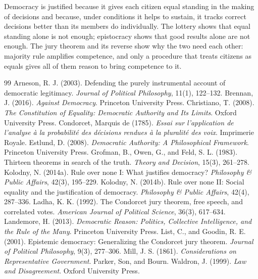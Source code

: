 \documentclass{situationist-preprint}
\begin{document}
Democracy is justified because it gives each citizen equal standing in the making of decisions and because, under conditions it helps to sustain, it tracks correct decisions better than its members do individually. The lottery shows that equal standing alone is not enough; epistocracy shows that good results alone are not enough. The jury theorem and its reverse show why the two need each other: majority rule amplifies competence, and only a procedure that treats citizens as equals gives all of them reason to bring competence to it.

\begin{thebibliography}{99}\small
{} Arneson, R. J. (2003). Defending the purely instrumental account of democratic legitimacy. \emph{Journal of Political Philosophy}, 11(1), 122--132.
 Brennan, J. (2016). \emph{Against Democracy}. Princeton University Press.
 Christiano, T. (2008). \emph{The Constitution of Equality: Democratic Authority and Its Limits}. Oxford University Press.
 Condorcet, Marquis de (1785). \emph{Essai sur l'application de l'analyse \`a la probabilit\'e des d\'ecisions rendues \`a la pluralit\'e des voix}. Imprimerie Royale.
 Estlund, D. (2008). \emph{Democratic Authority: A Philosophical Framework}. Princeton University Press.
 Grofman, B., Owen, G., and Feld, S. L. (1983). Thirteen theorems in search of the truth. \emph{Theory and Decision}, 15(3), 261--278.
 Kolodny, N. (2014a). Rule over none I: What justifies democracy? \emph{Philosophy \& Public Affairs}, 42(3), 195--229.
 Kolodny, N. (2014b). Rule over none II: Social equality and the justification of democracy. \emph{Philosophy \& Public Affairs}, 42(4), 287--336.
 Ladha, K. K. (1992). The Condorcet jury theorem, free speech, and correlated votes. \emph{American Journal of Political Science}, 36(3), 617--634.
 Landemore, H. (2013). \emph{Democratic Reason: Politics, Collective Intelligence, and the Rule of the Many}. Princeton University Press.
 List, C., and Goodin, R. E. (2001). Epistemic democracy: Generalizing the Condorcet jury theorem. \emph{Journal of Political Philosophy}, 9(3), 277--306.
 Mill, J. S. (1861). \emph{Considerations on Representative Government}. Parker, Son, and Bourn.
 Waldron, J. (1999). \emph{Law and Disagreement}. Oxford University Press.
\end{thebibliography}
\end{document}
